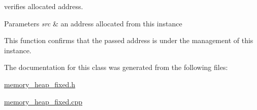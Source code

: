 verifies allocated address. 


\begin{DoxyParams}{Parameters}
{\em src} & an address allocated from this instance\\
\hline
\end{DoxyParams}

\begin{DoxyItemize}
\item This function confirms that the passed address is under the management of this instance. 
\end{DoxyItemize}

The documentation for this class was generated from the following files\-:\begin{DoxyCompactItemize}
\item 
\hyperlink{memory__heap__fixed_8h}{memory\-\_\-heap\-\_\-fixed.\-h}\item 
\hyperlink{memory__heap__fixed_8cpp}{memory\-\_\-heap\-\_\-fixed.\-cpp}\end{DoxyCompactItemize}
